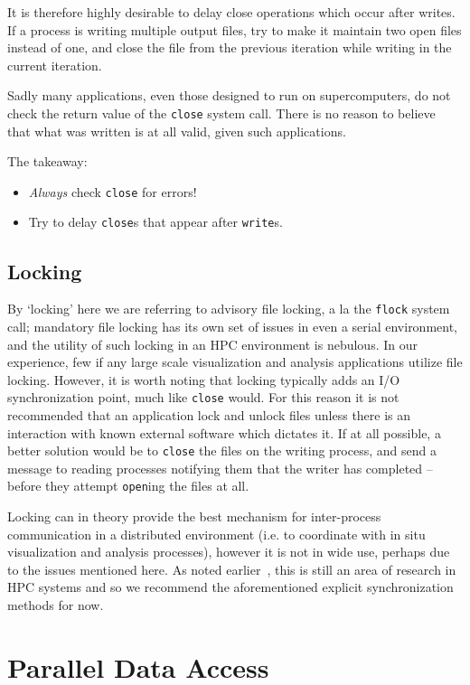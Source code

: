 It is therefore highly desirable to delay close operations which occur
after writes.  If a process is writing multiple output files, try to
make it maintain two open files instead of one, and close the file from
the previous iteration while writing in the current iteration.

Sadly many applications, even those designed to run on supercomputers,
do not check the return value of the \verb!close! system call.  There
is no reason to believe that what was written is at all valid, given
such applications.

The takeaway:

\begin{itemize}
  \item \emph{Always} check \verb!close! for errors!
  \item Try to delay \verb!close!s that appear after \verb!write!s.
\end{itemize}

\subsection{Locking}

By `locking' here we are referring to advisory file locking, a la
the \verb!flock! system call; mandatory file locking has its own
set of issues in even a serial environment, and the utility of such
locking in an HPC environment is nebulous.  In our experience, few
if any large scale visualization and analysis applications utilize
file locking.  However, it is worth noting that locking typically
adds an I/O synchronization point, much like \verb!close! would.  For
this reason it is not recommended that an application lock and unlock
files unless there is an interaction with known external software
which dictates it.  If at all possible, a better solution would be
to \verb!close! the files on the writing process, and send a message
to reading processes notifying them that the writer has completed --
before they attempt \verb!open!ing the files at all.

Locking can in theory provide the best mechanism for inter-process
communication in a distributed environment (i.e. to coordinate with in
situ visualization and analysis processes), however it is not in wide
use, perhaps due to the issues mentioned here.  As noted
earlier~\cite{Ching:2007:Locking}, this is still an area of research
in HPC systems and so we recommend the aforementioned explicit
synchronization methods for now.

\section{Parallel Data Access}\label{sec:access}

